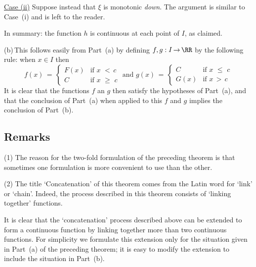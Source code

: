 {        \h \underline{Case (ii)} Suppose instead that ${\xi}$ is monotonic {\em down}. The argument is similar to Case~(i) and is left to the reader.

         In summary: the function $h$ is continuous at each point of $I$, as claimed.

\V

        (b)\,This follows easily from Part~(a) by defining $f,g:I \,{\rightarrow}\, {\RR}$ by the following rule: when $x{\in}I$ then
        \begin{equation}
        f(x) \,=\, 
                \left\{
        \begin{array}{ll}
      F(x) & \mbox{if $x\,\,<\,c$} \\
       C   & \mbox{if $x\,\,{\geq}\,\,c$}
        \end{array}
                 \right.
        \mbox{ and }
        g(x) \,=\, 
                \left\{
        \begin{array}{ll}
       C   & \mbox{if $x\,\,{\leq}\,\,c$} \\
      G(x) & \mbox{if $x\,>\,c$}
        \end{array}
                 \right.
        \end{equation}
    It is clear that the functions $f$ an $g$ then satisfy the hypotheses of Part~(a),
    and that the conclusion of Part~(a) when applied to this $f$ and $g$ implies the conclusion of Part~(b).

\V
            \subsection{\small{\bf Remarks}}
            \label{RemrkD30.05A}


 \hspace*{\parindent}(1) The reason for the two-fold formulation of the preceding theorem is that sometimes one formulation is more convenient to use than the other.

\V

        (2) The title `Concatenation' of this theorem comes from the Latin word for `link' or `chain'.
    Indeed, the process described in this theorem consists of `linking together' functions.

\VV

        It is clear that the `concatenation' process described above can be extended
    to form a continuous function by linking together more than two continuous functions.
    For simplicity we formulate this extension only for the situation given in Part~(a) of the preceding theorem;
    it is easy to modify the extension to include the situation in Part~(b).

}
